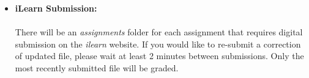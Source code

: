 \documentclass[12pt]{article}
\begin{document}
\begin{itemize}
 

%   
%        
        
        
       
      
     
        \item {\bf iLearn Submission:}\\ \\
There will be an {\it assignments} folder for each assignment that requires digital submission on the {\it ilearn} website. If you would like to re-submit a correction of updated file, please wait at least 2 minutes between submissions. Only the most recently submitted file will be graded.
   

\end{itemize}
\end{document}
